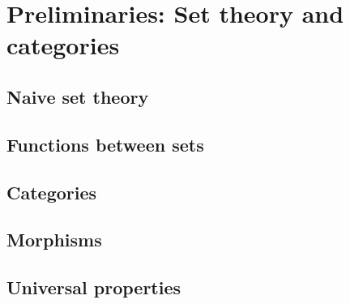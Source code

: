 \chapter{Preliminaries: Set theory and categories}

\section{Naive set theory}


\section{Functions between sets}


\section{Categories}


\section{Morphisms}


\section{Universal properties}

